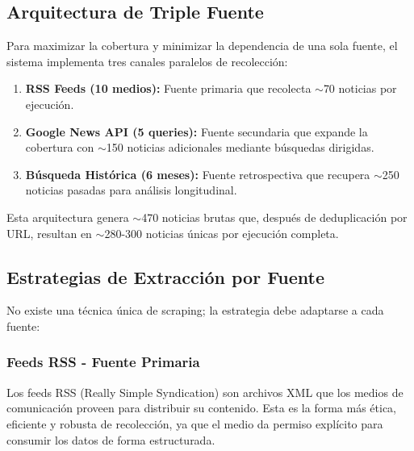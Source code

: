 \subsection{Arquitectura de Triple Fuente}
\label{subsec:triple_fuente}

Para maximizar la cobertura y minimizar la dependencia de una sola fuente, el sistema implementa tres canales paralelos de recolección:

\begin{enumerate}
    \item \textbf{RSS Feeds (10 medios):} Fuente primaria que recolecta $\sim$70 noticias por ejecución.
    \item \textbf{Google News API (5 queries):} Fuente secundaria que expande la cobertura con $\sim$150 noticias adicionales mediante búsquedas dirigidas.
    \item \textbf{Búsqueda Histórica (6 meses):} Fuente retrospectiva que recupera $\sim$250 noticias pasadas para análisis longitudinal.
\end{enumerate}

Esta arquitectura genera $\sim$470 noticias brutas que, después de deduplicación por URL, resultan en $\sim$280-300 noticias únicas por ejecución completa.

\subsection{Estrategias de Extracción por Fuente}
\label{subsec:estrategias_extraccion}

No existe una técnica única de scraping; la estrategia debe adaptarse a cada fuente:

\subsubsection{Feeds RSS - Fuente Primaria}
\label{subsubsec:rss_feeds}

Los feeds RSS (Really Simple Syndication) son archivos XML que los medios de comunicación proveen para distribuir su contenido. Esta es la forma más ética, eficiente y robusta de recolección, ya que el medio da permiso explícito para consumir los datos de forma estructurada.

